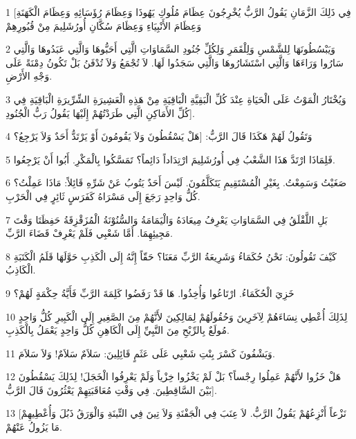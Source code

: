 \par 1 [فِي ذَلِكَ الزَّمَانِ يَقُولُ الرَّبُّ يُخْرِجُونَ عِظَامَ مُلُوكِ يَهُوذَا وَعِظَامَ رُؤَسَائِهِ وَعِظَامَ الْكَهَنَةِ وَعِظَامَ الأَنْبِيَاءِ وَعِظَامَ سُكَّانِ أُورُشَلِيمَ مِنْ قُبُورِهِمْ
\par 2 وَيَبْسُطُونَهَا لِلشَّمْسِ وَلِلْقَمَرِ وَلِكُلِّ جُنُودِ السَّمَاوَاتِ الَّتِي أَحَبُّوهَا وَالَّتِي عَبَدُوهَا وَالَّتِي سَارُوا وَرَاءَهَا وَالَّتِي اسْتَشَارُوهَا وَالَّتِي سَجَدُوا لَهَا. لاَ تُجْمَعُ وَلاَ تُدْفَنُ بَلْ تَكُونُ دِمْنَةً عَلَى وَجْهِ الأَرْضِ.
\par 3 وَيُخْتَارُ الْمَوْتُ عَلَى الْحَيَاةِ عِنْدَ كُلِّ الْبَقِيَّةِ الْبَاقِيَةِ مِنْ هَذِهِ الْعَشِيرَةِ الشِّرِّيرَةِ الْبَاقِيَةِ فِي كُلِّ الأَمَاكِنِ الَّتِي طَرَدْتُهُمْ إِلَيْهَا يَقُولُ رَبُّ الْجُنُودِ].
\par 4 وَتَقُولُ لَهُمْ هَكَذَا قَالَ الرَّبُّ: [هَلْ يَسْقُطُونَ وَلاَ يَقُومُونَ أَوْ يَرْتَدُّ أَحَدٌ وَلاَ يَرْجِعُ؟
\par 5 فَلِمَاذَا ارْتَدَّ هَذَا الشَّعْبُ فِي أُورُشَلِيمَ ارْتِدَاداً دَائِماً؟ تَمَسَّكُوا بِالْمَكْرِ. أَبُوا أَنْ يَرْجِعُوا.
\par 6 صَغَيْتُ وَسَمِعْتُ. بِغَيْرِ الْمُسْتَقِيمِ يَتَكَلَّمُونَ. لَيْسَ أَحَدٌ يَتُوبُ عَنْ شَرِّهِ قَائِلاً: مَاذَا عَمِلْتُ؟ كُلُّ وَاحِدٍ رَجَعَ إِلَى مَسْرَاهُ كَفَرَسٍ ثَائِرٍ فِي الْحَرْبِ.
\par 7 بَلِ اللَّقْلَقُ فِي السَّمَاوَاتِ يَعْرِفُ مِيعَادَهُ وَالْيَمَامَةُ وَالسُّنُوْنَةُ الْمُزَقْزِقَةُ حَفِظَتَا وَقْتَ مَجِيئِهِمَا. أَمَّا شَعْبِي فَلَمْ يَعْرِفْ قَضَاءَ الرَّبِّ.
\par 8 كَيْفَ تَقُولُونَ: نَحْنُ حُكَمَاءُ وَشَرِيعَةُ الرَّبِّ مَعَنَا؟ حَقّاً إِنَّهُ إِلَى الْكَذِبِ حَوَّلَهَا قَلَمُ الْكَتَبَةِ الْكَاذِبُ.
\par 9 خَزِيَ الْحُكَمَاءُ. ارْتَاعُوا وَأُخِذُوا. هَا قَدْ رَفَضُوا كَلِمَةَ الرَّبِّ فَأَيَّةُ حِكْمَةٍ لَهُمْ؟
\par 10 لِذَلِكَ أُعْطِي نِسَاءَهُمْ لِآخَرِينَ وَحُقُولَهُمْ لِمَالِكِينَ لأَنَّهُمْ مِنَ الصَّغِيرِ إِلَى الْكَبِيرِ كُلُّ وَاحِدٍ مُولَعٌ بِالرِّبْحِ مِنَ النَّبِيِّ إِلَى الْكَاهِنِ كُلُّ وَاحِدٍ يَعْمَلُ بِالْكَذِبِ.
\par 11 وَيَشْفُونَ كَسْرَ بِنْتِ شَعْبِي عَلَى عَثَمٍ قَائِلِينَ: سَلاَمٌ سَلاَمٌ! وَلاَ سَلاَمَ.
\par 12 هَلْ خَزُوا لأَنَّهُمْ عَمِلُوا رِجْساً؟ بَلْ لَمْ يَخْزُوا خِزْياً وَلَمْ يَعْرِفُوا الْخَجَلَ! لِذَلِكَ يَسْقُطُونَ بَيْنَ السَّاقِطِينَ. فِي وَقْتِ مُعَاقَبَتِهِمْ يَعْثُرُونَ قَالَ الرَّبُّ].
\par 13 [نَزْعاً أَنْزِعُهُمْ يَقُولُ الرَّبُّ. لاَ عِنَبَ فِي الْجَفْنَةِ وَلاَ تِينَ فِي التِّينَةِ وَالْوَرَقُ ذَبُلَ وَأُعْطِيهِمْ مَا يَزُولُ عَنْهُمْ.
